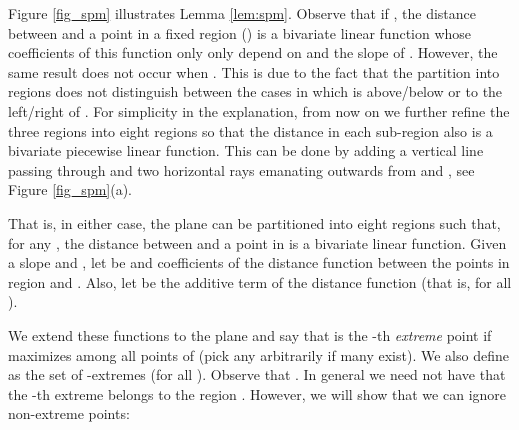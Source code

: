 \documentclass{llncs}
\begin{document}
Figure \ref{fig_spm} illustrates Lemma \ref{lem:spm}.
Observe that if , the distance between  and a point in a fixed region  () is a bivariate linear function whose coefficients of this function only only depend on  and the slope of . However, the same result does not occur when . This is due to the fact that the partition into regions does not distinguish between the cases in which  is above/below or to the left/right of . For simplicity in the explanation, from now on we further refine the three regions into eight regions so that the distance in each sub-region also is a bivariate piecewise linear function. This can be done by adding a vertical line passing through  and two horizontal rays emanating outwards from   and , see Figure \ref{fig_spm}(a).

That is, in either case, the plane can be partitioned into eight regions  such that, for any , the distance between  and a point in  is a bivariate linear function. Given a slope  and , let  be  and  coefficients of the distance function between the points in region  and . Also, let  be the additive term of the distance function (that is,  for all ).

We extend these functions to the plane and say that  is the -th {\em extreme} point if  maximizes  among all points of  (pick any arbitrarily if many exist). We also define  as the set of -extremes (for all ). Observe that . In general we need not have that the -th extreme belongs to the region . However, we will show that we can ignore non-extreme points:
\end{document}
